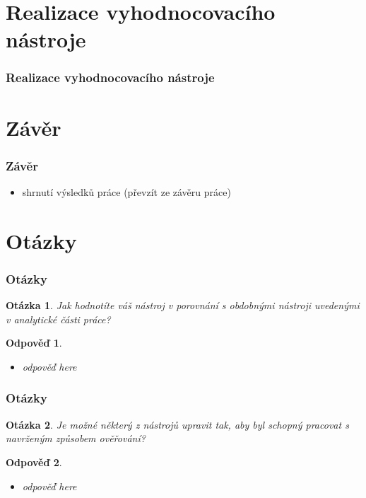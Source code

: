 \documentclass{beamer}
\newtheorem*{question}{Otázka}
\newtheorem*{response}{Odpověď}
\begin{document}
\section{Realizace vyhodnocovacího nástroje}
\begin{frame}
\frametitle{Realizace vyhodnocovacího nástroje}
\end{frame}

\section{Závěr}
\begin{frame}
\frametitle{Závěr}
\begin{itemize}
\item shrnutí výsledků práce (převzít ze závěru práce)
\end{itemize}
\end{frame}

\section{Otázky}
\begin{frame}
  \frametitle{Otázky}
  \begin{question}
    Jak hodnotíte váš nástroj v porovnání s obdobnými nástroji uvedenými v analytické části práce?
  \end{question}
  \begin{response}
    \begin{itemize}
      \item odpověď here
    \end{itemize}
  \end{response}
\end{frame}

\begin{frame}
  \frametitle{Otázky}
  \begin{question}
    Je možné některý z nástrojů upravit tak, aby byl schopný pracovat s navrženým způsobem ověřování?
  \end{question}
  \begin{response}
    \begin{itemize}
      \item odpověď here
    \end{itemize}
  \end{response}
\end{frame}
\end{document}
